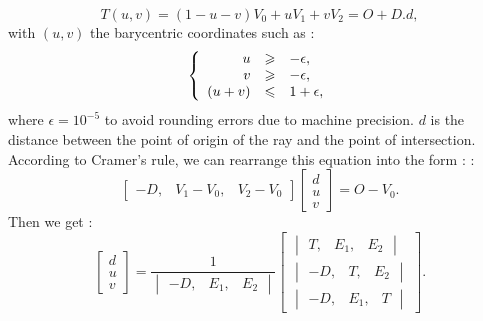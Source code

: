 \documentclass[AMA,STIX1COL]{WileyNJD-v2}
\begin{document}
\begin{equation} \label{eq_2moller}
T(u,v) = (1-u-v)V_0 + uV_1 + vV_2 = O + D.d,%
\end{equation}
%
with $(u,v)$ the barycentric coordinates such as :
\begin{equation}
   \left \{
   \begin{array}{r c l}
u & \geqslant & -\epsilon,  \\
v & \geqslant & -\epsilon,  \\
(u+v) & \leqslant & 1+\epsilon,
   \end{array}
   \right .
\end{equation}
where $\epsilon = 10^{-5}$ to avoid rounding errors due to machine precision. $d$ is the distance between the point of origin of the ray and the point of intersection. According to Cramer's rule, we can rearrange this equation into the form : :
%
\begin{equation}
	\begin{bmatrix}
 	  -D, & V_1-V_0, & V_2-V_0
	\end{bmatrix}
	\begin{bmatrix}
 	 d \\
	 u \\
	 v
	\end{bmatrix}
	= O-V_0.
\end{equation}
%
Then we get :
\begin{equation}
	\begin{bmatrix}
 	 d \\
	 u \\
	 v
	\end{bmatrix}
	=
	\frac{1}{
	\begin{vmatrix}
 	  -D, & E_1, & E_2
	\end{vmatrix}
	}
	\begin{bmatrix}
 	 	\begin{vmatrix}
 		  T, & E_1, & E_2
		\end{vmatrix} \\
 	 	\begin{vmatrix}
 		  -D, & T, & E_2
		\end{vmatrix} \\
 	 	\begin{vmatrix}
 		  -D, & E_1, & T
		\end{vmatrix}
	\end{bmatrix}	.
\end{equation}
\end{document}

